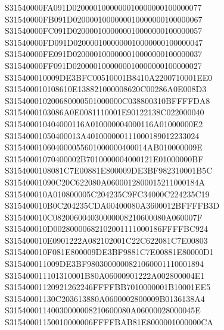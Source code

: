\documentclass[12pt,a4paper]{article}
\begin{document}
\begin{framed}
{S31540000FA091D0200001000000010000000100000077\newline
S31540000FB091D0200001000000010000000100000067\newline
S31540000FC091D0200001000000010000000100000057\newline
S31540000FD091D0200001000000010000000100000047\newline
S31540000FE091D0200001000000010000000100000037\newline
S31540000FF091D0200001000000010000000100000027\newline
S315400010009DE3BFC00510001B8410A2200710001EE0\newline
S315400010108610E138821000008620C00286A0E008D3\newline
S315400010200680000501000000C038800310BFFFFDA8\newline
S3154000103086A0E0081110001E90122138C022000040\newline
S315400010404000116A010000004000116A01000000E2\newline
S31540001050400013A401000000111000189012233024\newline
S315400010604000055601000000400014AB010000009E\newline
S31540001070400002B7010000004000121E01000000BF\newline
S3154000108081C7E00881E800009DE3BF982310001B5C\newline
S31540001090C20C622080A0600012800015211000184A\newline
S315400010A010800005C204235C9FC34000C224235C19\newline
S315400010B0C204235CDA00400080A3600012BFFFFB3D\newline
S315400010C082006004030000008210600080A060007F\newline
S315400010D00280000682102001111000186FFFFBC924\newline
S315400010E0901222A082102001C22C622081C7E00803\newline
S315400010F081E800009DE3BF9881C7E00881E80000D1\newline
S315400011009DE3BF9803000000821060001110001894\newline
S315400011101310001B80A06000901222A002800004E1\newline
S31540001120921262246FFFFBB7010000001B10001EE5\newline
S31540001130C203613880A0600002800009B0136138A4\newline
S31540001140030000008210600080A06000028000045E\newline
S31540001150010000006FFFFBAB81E8000001000000CA\newline
}
\end{framed}
\end{document}
